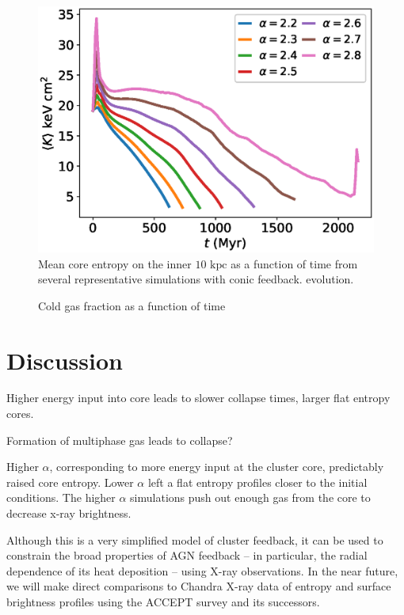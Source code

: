 \documentclass[iop,apjl, twocolappendix]{emulateapj}   %
\begin{document}
\begin{figure}
  \begin{center}
    \includegraphics[width=0.9\linewidth]{figures/conic/avgCoreEntropies.eps}
  \end{center}
  \caption{Mean core entropy on the inner $10 \text{ kpc}$ as
  a function of time from several representative simulations with conic feedback.  evolution.}
\end{figure}

\begin{figure}
  \caption{Cold gas fraction as a function of time}
\end{figure}



\section{Discussion}
\label{sec:discussion}

\textbullet Higher energy input into core leads to slower collapse times, larger flat entropy cores.

\textbullet Formation of multiphase gas leads to collapse?

Higher $\alpha$, corresponding to more energy input at the cluster core,
predictably raised core entropy. Lower $\alpha$ left a flat entropy
profiles closer to the initial conditions.  The higher $\alpha$
simulations push out enough gas from the core to decrease x-ray
brightness. 

Although this is a very simplified model of cluster feedback, it can be used to
constrain the broad properties of AGN feedback -- in particular, the radial
dependence of its heat deposition -- using X-ray observations.  In the near
future, we will make direct comparisons to Chandra X-ray data of entropy and
surface brightness profiles  using the ACCEPT survey
\cite{cavagnolo_intracluster_2009} and its successors.
\end{document}
